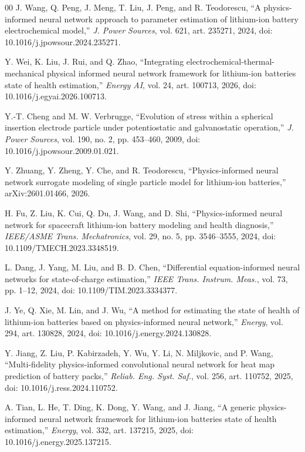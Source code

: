 \documentclass[conference]{IEEEtran}
\begin{document}
\begin{thebibliography}{00}
J. Wang, Q. Peng, J. Meng, T. Liu, J. Peng, and R. Teodorescu, ``A physics-informed neural network approach to parameter estimation of lithium-ion battery electrochemical model,'' \emph{J. Power Sources}, vol. 621, art. 235271, 2024, doi: 10.1016/j.jpowsour.2024.235271.

Y. Wei, K. Liu, J. Rui, and Q. Zhao, ``Integrating electrochemical-thermal-mechanical physical informed neural network framework for lithium-ion batteries state of health estimation,'' \emph{Energy AI}, vol. 24, art. 100713, 2026, doi: 10.1016/j.egyai.2026.100713.

Y.-T. Cheng and M. W. Verbrugge, ``Evolution of stress within a spherical insertion electrode particle under potentiostatic and galvanostatic operation,'' \emph{J. Power Sources}, vol. 190, no. 2, pp. 453--460, 2009, doi: 10.1016/j.jpowsour.2009.01.021.

Y. Zhuang, Y. Zheng, Y. Che, and R. Teodorescu, ``Physics-informed neural network surrogate modeling of single particle model for lithium-ion batteries,'' arXiv:2601.01466, 2026.

H. Fu, Z. Liu, K. Cui, Q. Du, J. Wang, and D. Shi, ``Physics-informed neural network for spacecraft lithium-ion battery modeling and health diagnosis,'' \emph{IEEE/ASME Trans. Mechatronics}, vol. 29, no. 5, pp. 3546--3555, 2024, doi: 10.1109/TMECH.2023.3348519.

L. Dang, J. Yang, M. Liu, and B. D. Chen, ``Differential equation-informed neural networks for state-of-charge estimation,'' \emph{IEEE Trans. Instrum. Meas.}, vol. 73, pp. 1--12, 2024, doi: 10.1109/TIM.2023.3334377.

J. Ye, Q. Xie, M. Lin, and J. Wu, ``A method for estimating the state of health of lithium-ion batteries based on physics-informed neural network,'' \emph{Energy}, vol. 294, art. 130828, 2024, doi: 10.1016/j.energy.2024.130828.

Y. Jiang, Z. Liu, P. Kabirzadeh, Y. Wu, Y. Li, N. Miljkovic, and P. Wang, ``Multi-fidelity physics-informed convolutional neural network for heat map prediction of battery packs,'' \emph{Reliab. Eng. Syst. Saf.}, vol. 256, art. 110752, 2025, doi: 10.1016/j.ress.2024.110752.

A. Tian, L. He, T. Ding, K. Dong, Y. Wang, and J. Jiang, ``A generic physics-informed neural network framework for lithium-ion batteries state of health estimation,'' \emph{Energy}, vol. 332, art. 137215, 2025, doi: 10.1016/j.energy.2025.137215.


\end{thebibliography}
\end{document}
